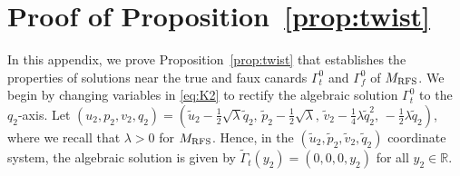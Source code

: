 \documentclass[11pt]{article}
\numberwithin{equation}{section}
\begin{document}
\section{Proof of Proposition~\ref{prop:twist}}\label{app:proptwist}

In this appendix, we prove Proposition~\ref{prop:twist} that establishes the properties of solutions near the true and faux canards $\Gamma_t^0$ and $\Gamma_f^0$ of $M_{\rm RFS}$.
We begin by changing variables in \eqref{eq:K2} to rectify the algebraic solution $\Gamma_t^0$ to the $q_2$-axis. 
Let 
$(u_2,p_2,v_2,q_2) 
= (\tilde{u}_2 - \frac{1}{2}\sqrt{\lambda} \tilde{q}_2, \,
\tilde{p}_2 - \frac{1}{2} \sqrt{\lambda}, \,
\tilde{v}_2 - \frac{1}{4} \lambda \tilde{q}_2^2, \, 
-\frac{1}{2} \lambda \tilde{q}_2)$,
where we recall that $\lambda>0$ for $M_{\rm RFS}$.
Hence, in the $(\tilde{u}_2,\tilde{p}_2,\tilde{v}_2,\tilde{q}_2)$ coordinate system, the algebraic solution is given by $\tilde{\Gamma}_t (y_2) = (0,0,0,y_2)$ for all $y_2 \in \mathbb{R}$.
\end{document}
